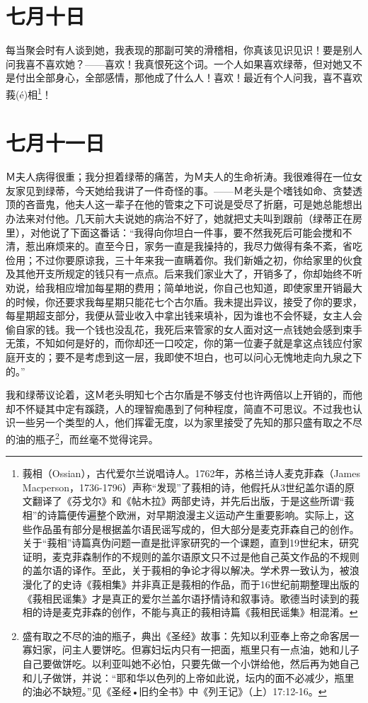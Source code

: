 \documentclass[12pt,oneside]{book}
\begin{document}
\chapter{七月十日}
每当聚会时有人谈到她，我表现的那副可笑的滑稽相，你真该见识见识！要是别人问我喜不喜欢她？——喜欢！我真恨死这个词。一个人如果喜欢绿蒂，但对她又不是付出全部身心，全部感情，那他成了什么人！喜欢！最近有个人问我，喜不喜欢莪(é)相\footnote{莪相（Ossian），古代爱尔兰说唱诗人。1762年，苏格兰诗人麦克菲森（James Macperson，1736-1796）声称“发现”了莪相的诗，他假托从3世纪盖尔语的原文翻译了《芬戈尔》和《帖木拉》两部史诗，并先后出版，于是这些所谓“莪相”的诗篇便传遍整个欧洲，对早期浪漫主义运动产生重要影响。实际上，这些作品虽有部分是根据盖尔语民谣写成的，但大部分是麦克菲森自己的创作。关于“莪相”诗篇真伪问题一直是批评家研究的一个课题，直到19世纪末，研究证明，麦克菲森制作的不规则的盖尔语原文只不过是他自己英文作品的不规则的盖尔语的译作。至此，关于莪相的争论才得以解决。学术界一致认为，被浪漫化了的史诗《莪相集》并非真正是莪相的作品，而于16世纪前期整理出版的《莪相民谣集》才是真正的爱尔兰盖尔语抒情诗和叙事诗。歌德当时读到的莪相的诗是麦克菲森的创作，不能与真正的莪相诗篇《莪相民谣集》相混淆。}！


\chapter{七月十一日}
Ｍ夫人病得很重；我分担着绿蒂的痛苦，为Ｍ夫人的生命祈涛。我很难得在一位女友家见到绿蒂，今天她给我讲了一件奇怪的事。——Ｍ老头是个嗜钱如命、贪婪透顶的吝啬鬼，他夫人这一辈子在他的管束之下可说是受尽了折磨，可是她总能想出办法来对付他。几天前大夫说她的病治不好了，她就把丈夫叫到跟前（绿蒂正在房里），对他说了下面这番话：“我得向你坦白一件事，要不然我死后可能会搅和不清，惹出麻烦来的。直至今日，家务一直是我操持的，我尽力做得有条不紊，省吃俭用；不过你要原谅我，三十年来我一直瞒着你。我们新婚之初，你给家里的伙食及其他开支所规定的钱只有一点点。后来我们家业大了，开销多了，你却始终不听劝说，给我相应增加每星期的费用；简单地说，你自己也知道，即使家里开销最大的时候，你还要求我每星期只能花七个古尔盾。我未提出异议，接受了你的要求，每星期超支部分，我便从营业收入中拿出钱来填补，因为谁也不会怀疑，女主人会偷自家的钱。我一个钱也没乱花，我死后来管家的女人面对这一点钱她会感到束手无策，不知如何是好的，而你却还一口咬定，你的第一位妻子就是拿这点钱应付家庭开支的；要不是考虑到这一层，我即使不坦白，也可以问心无愧地走向九泉之下的。”

我和绿蒂议论着，这Ｍ老头明知七个古尔盾是不够支付也许两倍以上开销的，而他却不怀疑其中定有蹊跷，人的理智痴愚到了何种程度，简直不可思议。不过我也认识一些另一个类型的人，他们挥霍无度，以为家里接受了先知的那只盛有取之不尽的油的瓶子\footnote{盛有取之不尽的油的瓶子，典出《圣经》故事：先知以利亚奉上帝之命客居一寡妇家，问主人要饼吃。但寡妇坛内只有一把面，瓶里只有一点油，她和儿子自己要做饼吃。以利亚叫她不必怕，只要先做一个小饼给他，然后再为她自己和儿子做饼，并说：“耶和华以色列的上帝如此说，坛内的面不必减少，瓶里的油必不缺短。”见《圣经•旧约全书》中《列王记》（上）17:12-16。}，而丝毫不觉得诧异。
\end{document}
